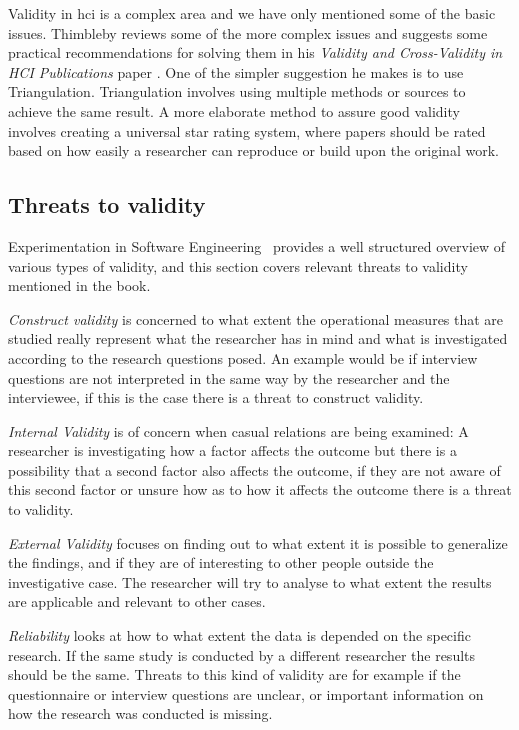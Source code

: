 Validity in \gls{hci} is a complex area and we have only mentioned some of the basic issues. Thimbleby reviews some of the more complex issues and suggests some practical recommendations for solving them in his \textit{Validity and Cross-Validity in HCI Publications} paper \cite{validation}. One of the simpler suggestion he makes is to use Triangulation. Triangulation involves using multiple methods or sources to achieve the same result. A more elaborate method to assure good validity involves creating a universal star rating system, where papers should be rated based on how easily a researcher can reproduce or build upon the original work.

\subsection{Threats to validity}
\label{subsec:threatsValidity}
Experimentation in Software Engineering~\cite{experiment} provides a well structured overview of various types of validity, and this section covers relevant threats to validity mentioned in the book.

\textit{Construct validity} is concerned to what extent the operational measures that are studied really represent what the researcher has in mind and what is investigated according to the research questions posed. An example would be if interview questions are not interpreted in the same way by the researcher and the interviewee, if this is the case there is a threat to construct validity.

\textit{Internal Validity} is of concern when casual relations are being examined: A researcher is investigating how a factor affects the outcome but there is a possibility that a second factor also affects the outcome, if they are not aware of this second factor or unsure how as to how it affects the outcome there is a threat to validity.

\textit{External Validity} focuses on finding out to what extent it is possible to generalize the findings, and if they are of interesting to other people outside the investigative case. The researcher will try to analyse to what extent the results are applicable and relevant to other cases.

\textit{Reliability} looks at how to what extent the data is depended on the specific research. If the same study is conducted by a different researcher the results should be the same. Threats to this kind of validity are for example if the questionnaire or interview questions are unclear, or important information on how the research was conducted is missing.


